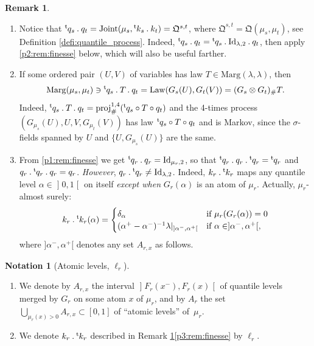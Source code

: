 \documentclass[10pt,a4paper]{article}
\providecommand{\skpt}{\smallskip}
\newcommand{\ldot}{\mathbin{.}}
\theoremstyle{plain}
\theoremstyle{definition}
\newtheorem{notation}[them]{Notation} %
\newtheorem{rem}[them]{Remark}
\newcommand{\id}{\mathrm{Id}}
\newcommand{\join}{\mathrm{Joint}}
\newcommand{\como}{\mathfrak{Q}}
\newcommand{\trans}{{}^{\mathrm{t}}\mkern-1mu}
\newcommand{\la}{\lambda}
\newcommand{\ma}{\mathrm{Marg}}
\newcommand{\law}{\operatorname{Law}}
\newcommand{\pr}{\operatorname{proj}}
\newcommand{\op}{\mathopen}
\newcommand{\clo}{\mathclose}
\begin{document}
\skpt
\begin{rem}\label{rem:finesse}
\begin{enumerate}
\item
\label{p1:rem:finesse} Notice that $\trans{q}_s \ldot q_t=\join(\mu_s,\trans{k}_s \ldot k_t)=\como^{s,t}$, where $\como^{s,t}=\como(\mu_s,\mu_t)$, see Definition \ref{defi:quantile_process}. Indeed, $\trans{q}_s \ldot q_t=\trans{q}_s \ldot\id_{\la,2}{}\ldot q_t$, then apply \eqref{p2:rem:finesse} below,
which will also be useful farther.

\item
\label{p2:rem:finesse} If some ordered pair $(U,V)$ of variables has law $T\in \ma(\la,\la)$, then\vspace*{-3pt}
\[
\ma(\mu_s,\mu_t)\ni\trans{q}_s \ldot T\ldot q_t=\law(G_s(U),G_t(V))=(G_s\otimes G_t)_\#T.
\]
Indeed, $\trans{q}_s \ldot T\ldot q_t=\pr^{1,4}_\#(\trans{q}_s \circ T\circ q_t)$ and the 4-times process $(G_{\mu_s}(U),U,V,G_{\mu_t}(V))$ has law $\trans{q}_s \circ T\circ q_t$ and is Markov, since the $\sigma$-fields spanned by $U$ and $\{U,G_{\mu_s}(U)\}$ are the same.

\item
\label{p3:rem:finesse} From \eqref{p1:rem:finesse} we get $\trans q_r\ldot q_r=\id_{\mu_r,2}$, so that $\trans q_r\ldot q_r\ldot\trans q_r=\trans q_r$ and $q_r\ldot\trans q_r\ldot q_r=q_r$. \emph{However}, $q_r\ldot\trans q_r\neq \id_{\la,2}$. Indeed, $k_r\ldot\trans{k}_r$ maps any quantile level $\alpha\in \op]0,1\clo[$ on itself \emph{except when} $G_r(\alpha)$ is an atom of $\mu_r$. Actually, $\mu_r$-almost surely:\vspace*{-3pt}
\begin{align*}
k_r\ldot\trans{k}_r(\alpha)=
\begin{cases}
\delta_\alpha&\text{if }\mu_r(G_{r}(\alpha))=0\\
(\alpha^+-\alpha^-)^{-1}\la|_{]\alpha^-,\alpha^+[}&\text{if }\alpha\in]\alpha^-,\alpha^+[,
\end{cases}
\end{align*}
where $]\alpha^-,\alpha^+[$ denotes any set $A_{r,x}$ as follows.
\end{enumerate}
\end{rem}

\skpt
\begin{notation}[Atomic levels, $\ell_r$]\label{nota:Asx}
\begin{enumerate}
\item
\label{p:Asx} We denote by $A_{r,x}$ the interval $\op]F_r(x^-),F_r(x)\clo[$ of quantile levels merged by $G_r$ on some atom $x$ of $\mu_r$, and by $A_r$ the set $\bigcup_{\mu_r(x)>0}A_{r,x}\!\subset\! [0,1]$ of ``atomic levels'' of~$\mu_r$.

\item
\label{p:l_R_fini} We denote $k_r\ldot\trans{k}_r$ described in Remark \ref{rem:finesse}\eqref{p3:rem:finesse} by $\ell_r$.
\end{enumerate}
\end{notation}
\end{document}
